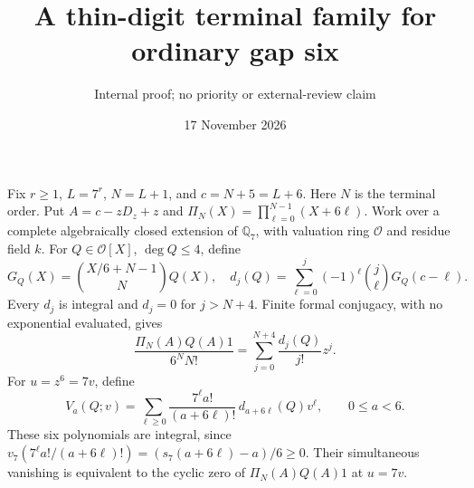 \documentclass[11pt]{article}
\title{A thin-digit terminal family for ordinary gap six}
\author{Internal proof; no priority or external-review claim}\date{17 November 2026}
\begin{document}
\setlength{\emergencystretch}{1em}\maketitle
Fix $r\ge1$, $L=7^r$, $N=L+1$, and $c=N+5=L+6$.
Here $N$ is the terminal order.
Put $A=c-zD_z+z$ and
$\Pi_N(X)=\prod_{\ell=0}^{N-1}(X+6\ell)$.
Work over a complete algebraically closed extension of $\mathbb Q_7$,
with valuation ring $\mathcal O$ and residue field $k$.
For $Q\in\mathcal O[X]$, $\deg Q\le4$, define
\[
 G_Q(X)=\binom{X/6+N-1}{N}Q(X),\quad
 d_j(Q)=\sum_{\ell=0}^j(-1)^\ell\binom j\ell G_Q(c-\ell).
\]
Every $d_j$ is integral and $d_j=0$ for $j>N+4$.
Finite formal conjugacy, with no exponential evaluated, gives
\[
 \frac{\Pi_N(A)Q(A)1}{6^N N!}
       =\sum_{j=0}^{N+4}\frac{d_j(Q)}{j!}z^j.             \tag{1}
\]
For $u=z^6=7v$, define
\[
 V_a(Q;v)=\sum_{\ell\ge0}
     \frac{7^\ell a!}{(a+6\ell)!}\,d_{a+6\ell}(Q)v^\ell,
 \qquad0\le a<6.                                       \tag{2}
\]
These six polynomials are integral, since
$v_7(7^\ell a!/(a+6\ell)!)=(s_7(a+6\ell)-a)/6\ge0$.
Their simultaneous vanishing is equivalent to the cyclic zero
of $\Pi_N(A)Q(A)1$ at $u=7v$.
\end{document}
